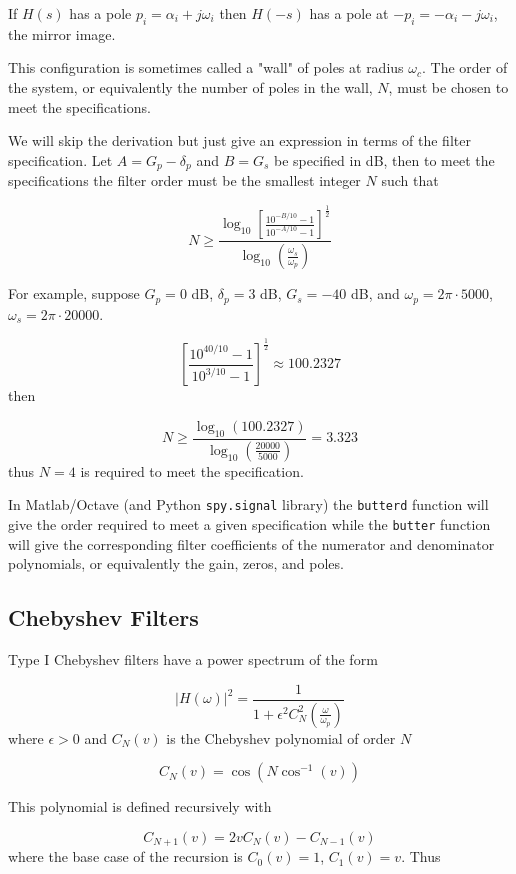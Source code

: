\documentclass{article}
\begin{document}
If $H(s)$ has a pole $p_i = \alpha_i + j\omega_i$ then $H(-s)$ has a pole at $-p_i = -\alpha_i - j\omega_i$, the mirror image.

This configuration is sometimes called a "wall" of poles at radius $\omega_c$. The order of the system, or equivalently the number of poles in the wall, $N$, must be chosen to meet the specifications.

We will skip the derivation but just give an expression in terms of the filter specification. Let $A = G_p - \delta_p$ and $B=G_s$ be specified in dB, then to meet the specifications the filter order must be the smallest integer $N$ such that

\[
N \geq \frac{\log_{10}\left[ \frac{10^{-B/10}-1}{10^{-A/10}-1} \right]^{\frac{1}{2}}}{\log_{10}\left( \frac{\omega_s}{\omega_p}\right)}
\]

For example, suppose $G_p = 0$ dB, $\delta_p = 3$ dB, $G_s = -40$ dB, and $\omega_p = 2\pi\cdot 5000$, $\omega_s = 2\pi\cdot 20 000$.

\[
\left[ \frac{10^{40/10}-1}{10^{3/10}-1} \right]^{\frac{1}{2}} \approx 100.2327
\]
then

\[
N \geq \frac{\log_{10}(100.2327)}{\log_{10}\left( \frac{20000}{5000}\right)} = 3.323
\]
thus $N = 4$ is required to meet the specification.

In Matlab/Octave (and Python \texttt{spy.signal} library) the \texttt{butterd} function will give the order required to meet a given specification while the \texttt{butter} function will give the corresponding filter coefficients of the numerator and denominator polynomials, or equivalently the gain, zeros, and poles.

\subsection{Chebyshev Filters}

Type I Chebyshev filters have a power spectrum of the form

\[
\left| H(\omega) \right|^2 = \frac{1}{1 + \epsilon^2C_N^2\left( \frac{\omega}{\omega_p}\right)}
\]
where $\epsilon > 0$ and $C_N(v)$ is the Chebyshev polynomial of order $N$

\[
C_N(v) = \cos\left(N\cos^{-1}(v)\right)
\]

This polynomial is defined recursively with

\[
C_{N+1}(v) = 2vC_N(v) - C_{N-1}(v)
\]
where the base case of the recursion is $C_0(v) = 1$, $C_1(v) = v$. Thus
\end{document}
